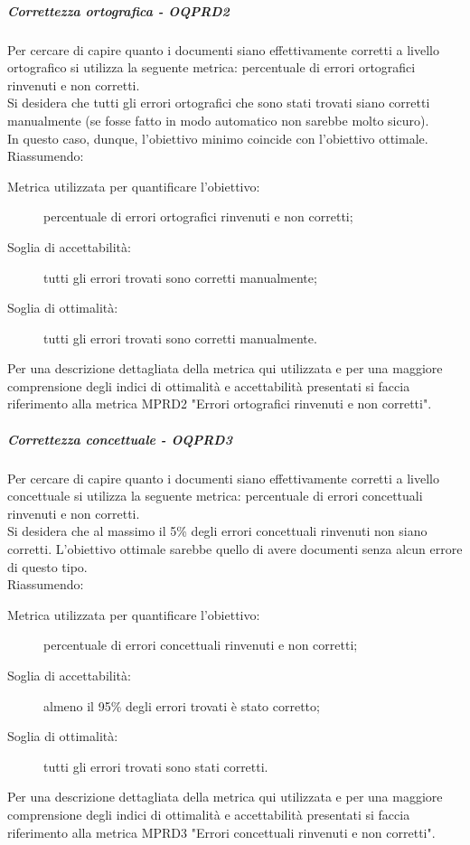 \documentclass[../PianoDiQualifica.tex]{subfiles}
\begin{document}
				\subparagraph{Correttezza ortografica - OQPRD2}
				Per cercare di capire quanto i documenti siano effettivamente corretti a livello ortografico si utilizza la seguente metrica: percentuale di errori ortografici rinvenuti e non corretti.\\
				Si desidera che tutti gli errori ortografici che sono stati trovati siano corretti manualmente (se fosse fatto in modo automatico non sarebbe molto sicuro).\\
				In questo caso, dunque, l'obiettivo minimo coincide con l’obiettivo ottimale.\\
				Riassumendo:
				\begin{description}
					\item[Metrica utilizzata per quantificare l’obiettivo:] percentuale di errori ortografici rinvenuti e non corretti;
					\item[Soglia di accettabilità:] tutti gli errori trovati sono corretti manualmente;
					\item[Soglia di ottimalità:] tutti gli errori trovati sono corretti manualmente.
				\end{description}
				Per una descrizione dettagliata della metrica qui utilizzata e per una maggiore comprensione degli indici di ottimalità e accettabilità presentati si faccia riferimento alla metrica MPRD2 "Errori ortografici rinvenuti e non corretti".
				
				\subparagraph{Correttezza concettuale - OQPRD3}
				Per cercare di capire quanto i documenti siano effettivamente corretti a livello concettuale si utilizza la seguente metrica: percentuale di errori concettuali rinvenuti e non corretti.\\
				Si desidera che al massimo il 5\% degli errori concettuali rinvenuti non siano corretti. L’obiettivo ottimale sarebbe quello di avere documenti senza alcun errore di questo tipo.\\
				Riassumendo:
				\begin{description}
					\item[Metrica utilizzata per quantificare l’obiettivo:] percentuale di errori concettuali rinvenuti e non corretti;
					\item[Soglia di accettabilità:] almeno il 95\% degli errori trovati è stato corretto;
					\item[Soglia di ottimalità:] tutti gli errori trovati sono stati corretti.
				\end{description}
				Per una descrizione dettagliata della metrica qui utilizzata e per una maggiore comprensione degli indici di ottimalità e accettabilità presentati si faccia riferimento alla metrica MPRD3 "Errori concettuali rinvenuti e non corretti".
			
\end{document}
